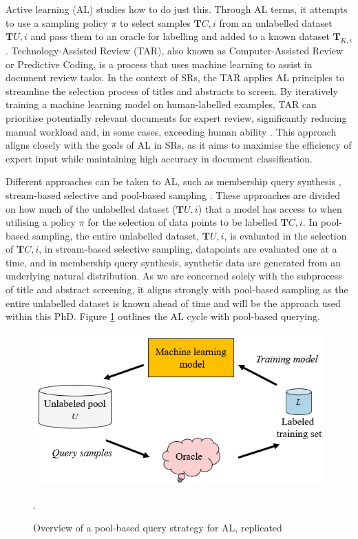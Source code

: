 \documentclass[10pt, english]{article}
\begin{document}
Active learning (AL) studies how to do just this. Through AL terms, it attempts to use a sampling policy $\pi$ to select samples $\mathbf{T}{C,i}$ from an unlabelled dataset $\mathbf{T}{U,i}$ and pass them to an oracle for labelling and added to a known dataset $\mathbf{T}_{K,i}$. Technology-Assisted Review (TAR), also known as Computer-Assisted Review or Predictive Coding, is a process that uses machine learning to assist in document review tasks. In the context of SRs, the TAR applies AL principles to streamline the selection process of titles and abstracts to screen. By iteratively training a machine learning model on human-labelled examples, TAR can prioritise potentially relevant documents for expert review, significantly reducing manual workload and, in some cases, exceeding human ability \cite{grossman_technology-assisted_2010}. This approach aligns closely with the goals of AL in SRs, as it aims to maximise the efficiency of expert input while maintaining high accuracy in document classification. 

Different approaches can be taken to AL, such as membership query synthesis \cite{angluin_queries_1988}, stream-based selective \cite{akinseloyin_novel_2024} and pool-based sampling \cite{lewis_sequential_1994}. These approaches are divided on how much of the unlabelled dataset ($\mathbf{T}{U, i}$) that a model has access to when utilising a policy $\pi$ for the selection of data points to be labelled $\mathbf{T}{C,i}$. In pool-based sampling, the entire unlabelled dataset, $\mathbf{T}{U,i}$, is evaluated in the selection of $\mathbf{T}{C,i}$, in stream-based selective sampling, datapoints are evaluated one at a time, and in membership query synthesis, synthetic data are generated from an underlying natural distribution. As we are concerned solely with the subprocess of title and abstract screening, it aligns strongly with pool-based sampling as the entire unlabelled dataset is known ahead of time and will be the approach used within this PhD. Figure \ref{fig:pool_based_query} outlines the AL cycle with pool-based querying.

\begin{figure}
\centering
\includegraphics[width=0.5\linewidth]{images/pool_based_strategy.png}
\caption{Overview of a pool-based query strategy for AL, replicated\cite{ren_survey_2021}}.
\label{fig:pool_based_query}
\end{figure}
\end{document}
